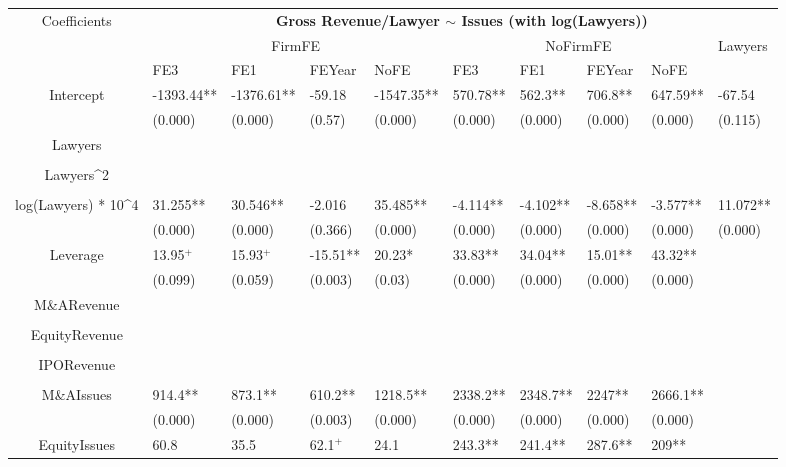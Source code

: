 \documentclass{article}
\begin{document}
\begin{table}[H]
\centering
\begin{tabular}{|clllllllll|}
\hline
\multirow{3}{*}{Coefficients} & \multicolumn{9}{c|}{\textbf{Gross Revenue/Lawyer $\sim$ Issues (with log(Lawyers))}} \\
\cline{2-10}
& \multicolumn{4}{c}{FirmFE} & \multicolumn{4}{c}{NoFirmFE} & \multirow{2}{*}{Lawyers} \\
\cline{2-9}
& FE3 & FE1 & FEYear & NoFE & FE3 & FE1 & FEYear & NoFE &  \\
\hline
 
Intercept & -1393.44** & -1376.61** & -59.18 & -1547.35** & 570.78** & 562.3** & 706.8** & 647.59** & -67.54 \\ 
   & (0.000) & (0.000) & (0.57) & (0.000) & (0.000) & (0.000) & (0.000) & (0.000) & (0.115) \\ 
  Lawyers &  &  &  &  &  &  &  &  &  \\ 
   &  &  &  &  &  &  &  &  &  \\ 
  Lawyers^2 &  &  &  &  &  &  &  &  &  \\ 
   &  &  &  &  &  &  &  &  &  \\ 
  log(Lawyers) * 10^4 & 31.255** & 30.546** & -2.016 & 35.485** & -4.114** & -4.102** & -8.658** & -3.577** & 11.072** \\ 
   & (0.000) & (0.000) & (0.366) & (0.000) & (0.000) & (0.000) & (0.000) & (0.000) & (0.000) \\ 
  Leverage & 13.95$^{+}$ & 15.93$^{+}$ & -15.51** & 20.23* & 33.83** & 34.04** & 15.01** & 43.32** &  \\ 
   & (0.099) & (0.059) & (0.003) & (0.03) & (0.000) & (0.000) & (0.000) & (0.000) &  \\ 
  M\&ARevenue &  &  &  &  &  &  &  &  &  \\ 
   &  &  &  &  &  &  &  &  &  \\ 
  EquityRevenue &  &  &  &  &  &  &  &  &  \\ 
   &  &  &  &  &  &  &  &  &  \\ 
  IPORevenue &  &  &  &  &  &  &  &  &  \\ 
   &  &  &  &  &  &  &  &  &  \\ 
  M\&AIssues & 914.4** & 873.1** & 610.2** & 1218.5** & 2338.2** & 2348.7** & 2247** & 2666.1** &  \\ 
   & (0.000) & (0.000) & (0.003) & (0.000) & (0.000) & (0.000) & (0.000) & (0.000) &  \\ 
  EquityIssues & 60.8 & 35.5 & 62.1$^{+}$ & 24.1 & 243.3** & 241.4** & 287.6** & 209** &  \\ 

\end{tabular}
\end{table}
\end{document}
